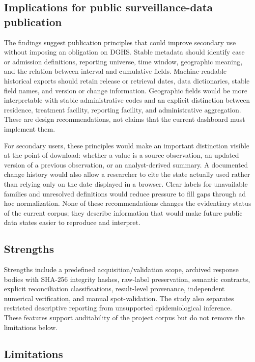 \subsection{Implications for public surveillance-data publication}

The findings suggest publication principles that could improve secondary use without imposing an obligation on DGHS. Stable metadata should identify case or admission definitions, reporting universe, time window, geographic meaning, and the relation between interval and cumulative fields. Machine-readable historical exports should retain release or retrieval dates, data dictionaries, stable field names, and version or change information. Geographic fields would be more interpretable with stable administrative codes and an explicit distinction between residence, treatment facility, reporting facility, and administrative aggregation. These are design recommendations, not claims that the current dashboard must implement them.

For secondary users, these principles would make an important distinction visible at the point of download: whether a value is a source observation, an updated version of a previous observation, or an analyst-derived summary. A documented change history would also allow a researcher to cite the state actually used rather than relying only on the date displayed in a browser. Clear labels for unavailable families and unresolved definitions would reduce pressure to fill gaps through ad hoc normalization. None of these recommendations changes the evidentiary status of the current corpus; they describe information that would make future public data states easier to reproduce and interpret.

\subsection{Strengths}

Strengths include a predefined acquisition/validation scope, archived response bodies with SHA-256 integrity hashes, raw-label preservation, semantic contracts, explicit reconciliation classifications, result-level provenance, independent numerical verification, and manual spot-validation. The study also separates restricted descriptive reporting from unsupported epidemiological inference. These features support auditability of the project corpus but do not remove the limitations below.

\subsection{Limitations}

